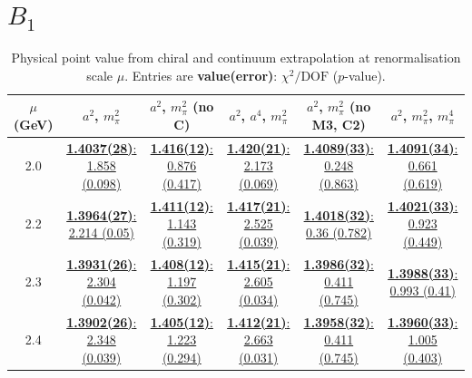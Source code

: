 \documentclass[12pt]{extarticle}
\begin{document}
\section{$B_1$}
\begin{table}[h!]
\begin{center}
\begin{tabular}{|c|c|c|c|c|c|}
\hline
$\mu$ (GeV) & $a^2$, $m_\pi^2$& $a^2$, $m_\pi^2$ (no C)& $a^2$, $a^4$, $m_\pi^2$& $a^2$, $m_\pi^2$ (no M3, C2)& $a^2$, $m_\pi^2$, $m_\pi^4$\\
\hline
2.0& \hyperlink{VVpAA/SUSY/a2m2_20.pdf.1}{\textbf{1.4037(28)}: 1.858 (0.098)} & \hyperlink{VVpAA/SUSY/a2m2noC_20.pdf.1}{\textbf{1.416(12)}: 0.876 (0.417)} & \hyperlink{VVpAA/SUSY/a2a4m2_20.pdf.1}{\textbf{1.420(21)}: 2.173 (0.069)} & \hyperlink{VVpAA/SUSY/a2m2mcut_20.pdf.1}{\textbf{1.4089(33)}: 0.248 (0.863)} & \hyperlink{VVpAA/SUSY/a2m2m4_20.pdf.1}{\textbf{1.4091(34)}: 0.661 (0.619)}\\
2.2& \hyperlink{VVpAA/SUSY/a2m2_22.pdf.1}{\textbf{1.3964(27)}: 2.214 (0.05)} & \hyperlink{VVpAA/SUSY/a2m2noC_22.pdf.1}{\textbf{1.411(12)}: 1.143 (0.319)} & \hyperlink{VVpAA/SUSY/a2a4m2_22.pdf.1}{\textbf{1.417(21)}: 2.525 (0.039)} & \hyperlink{VVpAA/SUSY/a2m2mcut_22.pdf.1}{\textbf{1.4018(32)}: 0.36 (0.782)} & \hyperlink{VVpAA/SUSY/a2m2m4_22.pdf.1}{\textbf{1.4021(33)}: 0.923 (0.449)}\\
2.3& \hyperlink{VVpAA/SUSY/a2m2_23.pdf.1}{\textbf{1.3931(26)}: 2.304 (0.042)} & \hyperlink{VVpAA/SUSY/a2m2noC_23.pdf.1}{\textbf{1.408(12)}: 1.197 (0.302)} & \hyperlink{VVpAA/SUSY/a2a4m2_23.pdf.1}{\textbf{1.415(21)}: 2.605 (0.034)} & \hyperlink{VVpAA/SUSY/a2m2mcut_23.pdf.1}{\textbf{1.3986(32)}: 0.411 (0.745)} & \hyperlink{VVpAA/SUSY/a2m2m4_23.pdf.1}{\textbf{1.3988(33)}: 0.993 (0.41)}\\
2.4& \hyperlink{VVpAA/SUSY/a2m2_24.pdf.1}{\textbf{1.3902(26)}: 2.348 (0.039)} & \hyperlink{VVpAA/SUSY/a2m2noC_24.pdf.1}{\textbf{1.405(12)}: 1.223 (0.294)} & \hyperlink{VVpAA/SUSY/a2a4m2_24.pdf.1}{\textbf{1.412(21)}: 2.663 (0.031)} & \hyperlink{VVpAA/SUSY/a2m2mcut_24.pdf.1}{\textbf{1.3958(32)}: 0.411 (0.745)} & \hyperlink{VVpAA/SUSY/a2m2m4_24.pdf.1}{\textbf{1.3960(33)}: 1.005 (0.403)}\\
\hline
\end{tabular}
\caption{Physical point value from chiral and continuum extrapolation at renormalisation scale $\mu$. Entries are \textbf{value(error)}: $\chi^2/\text{DOF}$ ($p$-value).}
\end{center}
\end{table}
\end{document}

